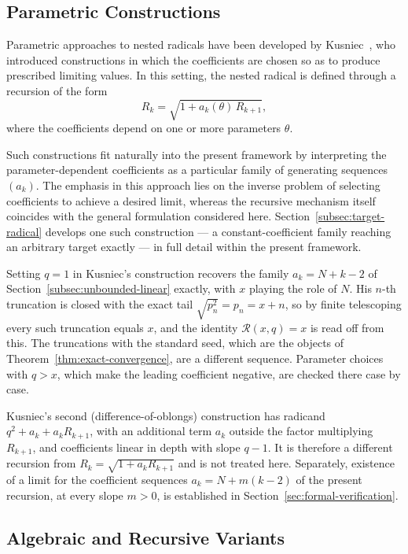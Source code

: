 \documentclass[11pt,a4paper]{amsart}
\theoremstyle{plain}
\theoremstyle{definition}
\theoremstyle{remark}
\begin{document}
\subsection{Parametric Constructions}
\label{subsec:parametric}

Parametric approaches to nested radicals have been developed by Kusniec~\cite{KusniecRadiciators}, who introduced constructions in which the coefficients are chosen so as to produce prescribed limiting values. In this setting, the nested radical is defined through a recursion of the form
\[
R_k = \sqrt{1 + a_k(\theta)\, R_{k+1}},
\]
where the coefficients depend on one or more parameters $\theta$.

Such constructions fit naturally into the present framework by interpreting the parameter-dependent coefficients as a particular family of generating sequences $(a_k)$. The emphasis in this approach lies on the inverse problem of selecting coefficients to achieve a desired limit, whereas the recursive mechanism itself coincides with the general formulation considered here. Section~\ref{subsec:target-radical} develops one such construction — a constant-coefficient family reaching an arbitrary target exactly — in full detail within the present framework.

Setting $q=1$ in Kusniec's construction recovers the family $a_k = N+k-2$ of Section~\ref{subsec:unbounded-linear} exactly, with $x$ playing the role of $N$. His $n$-th truncation is closed with the exact tail $\sqrt{p_n^2}=p_n=x+n$, so by finite telescoping every such truncation equals $x$, and the identity $\mathcal{R}(x,q)=x$ is read off from this. The truncations with the standard seed, which are the objects of Theorem~\ref{thm:exact-convergence}, are a different sequence. Parameter choices with $q>x$, which make the leading coefficient negative, are checked there case by case.

Kusniec's second (difference-of-oblongs) construction has radicand $q^2+a_k+a_kR_{k+1}$, with an additional term $a_k$ outside the factor multiplying $R_{k+1}$, and coefficients linear in depth with slope $q-1$. It is therefore a different recursion from $R_k=\sqrt{1+a_kR_{k+1}}$ and is not treated here. Separately, existence of a limit for the coefficient sequences $a_k = N+m(k-2)$ of the present recursion, at every slope $m>0$, is established in Section~\ref{sec:formal-verification}.

\subsection{Algebraic and Recursive Variants}
\label{subsec:algebraic-recursive}
\end{document}
